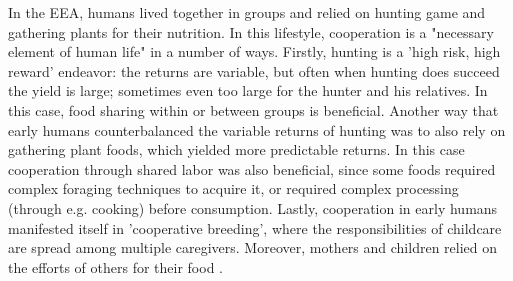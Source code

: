 In the EEA, humans lived together in groups and relied on hunting game and gathering plants for their nutrition.
In this lifestyle, cooperation is a "necessary element of human life" \citep[p.~R448]{ApicellaSilk19} in a number of ways. Firstly, hunting is a 'high risk, high reward' endeavor: the returns are variable, but often when hunting does succeed the yield is large; sometimes even too large for the hunter and his relatives. In this case, food sharing within or between groups is beneficial.
Another way that early humans counterbalanced the variable returns of hunting was to also rely on gathering plant foods, which yielded more predictable returns. In this case cooperation through shared labor was also beneficial, since some foods required complex foraging techniques to acquire it, or required complex processing (through e.g. cooking) before consumption.
Lastly, cooperation in early humans manifested itself in 'cooperative breeding', where the responsibilities of childcare are spread among multiple caregivers. Moreover, mothers and children relied on the efforts of others for their food \citep{ApicellaSilk19}.


